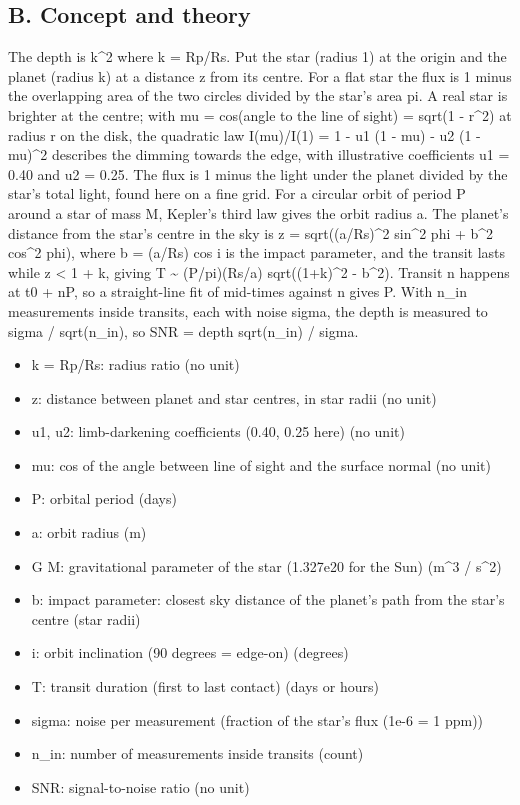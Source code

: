\documentclass[11pt,a4paper]{article}
\begin{document}
\subsection*{B. Concept and theory}
The depth is k\textasciicircum{}2 where k = Rp/Rs. Put the star (radius 1) at the origin and the planet (radius k) at a distance z from its centre. For a flat star the flux is 1 minus the overlapping area of the two circles divided by the star's area pi. A real star is brighter at the centre; with mu = cos(angle to the line of sight) = sqrt(1 - r\textasciicircum{}2) at radius r on the disk, the quadratic law I(mu)/I(1) = 1 - u1 (1 - mu) - u2 (1 - mu)\textasciicircum{}2 describes the dimming towards the edge, with illustrative coefficients u1 = 0.40 and u2 = 0.25. The flux is 1 minus the light under the planet divided by the star's total light, found here on a fine grid. For a circular orbit of period P around a star of mass M, Kepler's third law gives the orbit radius a. The planet's distance from the star's centre in the sky is z = sqrt((a/Rs)\textasciicircum{}2 sin\textasciicircum{}2 phi + b\textasciicircum{}2 cos\textasciicircum{}2 phi), where b = (a/Rs) cos i is the impact parameter, and the transit lasts while z \textless{} 1 + k, giving T \textasciitilde{} (P/pi)(Rs/a) sqrt((1+k)\textasciicircum{}2 - b\textasciicircum{}2). Transit n happens at t0 + nP, so a straight-line fit of mid-times against n gives P. With n\_in measurements inside transits, each with noise sigma, the depth is measured to sigma / sqrt(n\_in), so SNR = depth sqrt(n\_in) / sigma.

\begin{itemize}[nosep]
\item k = Rp/Rs: radius ratio (no unit)
\item z: distance between planet and star centres, in star radii (no unit)
\item u1, u2: limb-darkening coefficients (0.40, 0.25 here) (no unit)
\item mu: cos of the angle between line of sight and the surface normal (no unit)
\item P: orbital period (days)
\item a: orbit radius (m)
\item G M: gravitational parameter of the star (1.327e20 for the Sun) (m\textasciicircum{}3 / s\textasciicircum{}2)
\item b: impact parameter: closest sky distance of the planet's path from the star's centre (star radii)
\item i: orbit inclination (90 degrees = edge-on) (degrees)
\item T: transit duration (first to last contact) (days or hours)
\item sigma: noise per measurement (fraction of the star's flux (1e-6 = 1 ppm))
\item n\_in: number of measurements inside transits (count)
\item SNR: signal-to-noise ratio (no unit)
\end{itemize}
\end{document}
